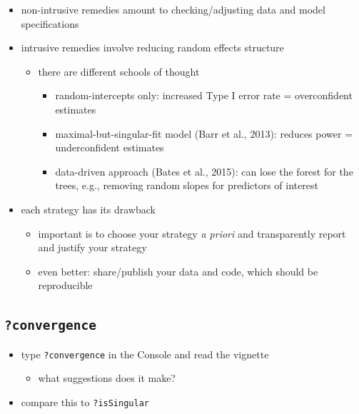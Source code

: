 \documentclass[
  letterpaper,
  DIV=11,
  numbers=noendperiod]{scrartcl}
\providecommand{\tightlist}{%
  \setlength{\itemsep}{0pt}\setlength{\parskip}{0pt}}\usepackage{longtable,booktabs,array}
\begin{document}
\begin{itemize}
\item
  non-intrusive remedies amount to checking/adjusting data and model
  specifications
\item
  intrusive remedies involve reducing random effects structure

  \begin{itemize}
  \tightlist
  \item
    there are different schools of thought

    \begin{itemize}
    \tightlist
    \item
      random-intercepts only: increased Type I error rate =
      overconfident estimates
    \item
      maximal-but-singular-fit model (Barr et al., 2013): reduces power
      = underconfident estimates
    \item
      data-driven approach (Bates et al., 2015): can lose the forest for
      the trees, e.g., removing random slopes for predictors of interest
    \end{itemize}
  \end{itemize}
\item
  each strategy has its drawback

  \begin{itemize}
  \tightlist
  \item
    important is to choose your strategy \emph{a priori} and
    transparently report and justify your strategy
  \item
    even better: share/publish your data and code, which should be
    reproducible
  \end{itemize}
\end{itemize}

\hypertarget{convergence}{%
\subsection{\texorpdfstring{\texttt{?convergence}}{?convergence}}\label{convergence}}

\begin{itemize}
\tightlist
\item
  type \texttt{?convergence} in the Console and read the vignette

  \begin{itemize}
  \tightlist
  \item
    what suggestions does it make?
  \end{itemize}
\item
  compare this to \texttt{?isSingular}
\end{itemize}
\end{document}
